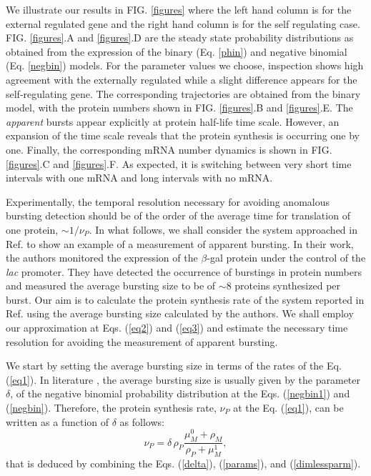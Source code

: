 We illustrate our results in FIG. \ref{figures} where the left hand
column is for the external regulated gene and the right hand column is
for the self regulating case. FIG. \ref{figures}.A and \ref{figures}.D
are the steady state probability distributions as obtained from the
expression of the binary (Eq. \ref{phin}) and negative binomial
(Eq. \ref{negbin}) models.  For the parameter values we choose,
inspection shows high agreement with the externally regulated while a
slight difference appears for the self-regulating gene.  The
corresponding trajectories are obtained from the binary model, with
the protein numbers shown in FIG. \ref{figures}.B and
\ref{figures}.E. The {\it apparent} bursts appear explicitly at
protein half-life time scale. However, an expansion of the time scale
reveals that the protein synthesis is occurring one by one.  Finally,
the corresponding mRNA number dynamics is shown in
FIG. \ref{figures}.C and \ref{figures}.F. As expected, it is switching
between very short time intervals with one mRNA and long intervals
with no mRNA.

Experimentally, the temporal resolution necessary for avoiding
anomalous bursting detection should be of the order of the average
time for translation of one protein, $\sim 1/\nu_P$. In what follows,
we shall consider the system approached in Ref. \cite{cai06} to show
an example of a measurement of apparent bursting. In their work, the
authors monitored the expression of the $\beta$-gal protein under the
control of the {\em lac} promoter. They have detected the occurrence
of burstings in protein numbers and measured the average bursting size
to be of $\sim 8$ proteins synthesized per burst. Our aim is to
calculate the protein synthesis rate of the system reported in
Ref. \cite{cai06} using the average bursting size calculated by the
authors. We shall employ our approximation at Eqs. (\ref{eq2}) and
(\ref{eq3}) and estimate the necessary time resolution for avoiding
the measurement of apparent bursting.

We start by setting the average bursting size in terms of the rates of
the Eq. (\ref{eq1}). In literature \cite{Shahrezaei2008}, the average
bursting size is usually given by the parameter $\delta$, of the
negative binomial probability distribution at the Eqs. (\ref{negbin1})
and (\ref{negbin}). Therefore, the protein synthesis rate, $\nu_P$ at
the Eq. (\ref{eq1}), can be written as a function of $\delta$ as
follows:
\begin{equation}\label{psynthesis}
\nu_P = \delta \, \rho_P \frac{\mu_M^0+\rho_M}{\rho_P + \mu^1_M},
\end{equation}
that is deduced by combining the Eqs. (\ref{delta}), (\ref{params}),
and (\ref{dimlessparm}).

